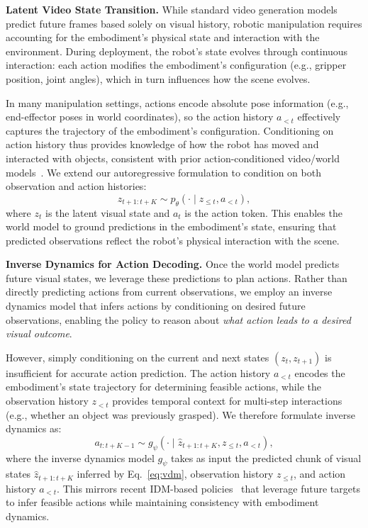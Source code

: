 \documentclass[onecolumn]{robbyant}           %
\begin{document}
\noindent\textbf{Latent Video State Transition.}
While standard video generation models predict future frames based solely on visual history, robotic manipulation requires accounting for the embodiment's physical state and interaction with the environment.
During deployment, the robot's state evolves through continuous interaction: each action modifies the embodiment's configuration (e.g., gripper position, joint angles), which in turn influences how the scene evolves.

In many manipulation settings, actions encode absolute pose information (e.g., end-effector poses in world coordinates), so the action history $a_{<t}$ effectively captures the trajectory of the embodiment's configuration.
Conditioning on action history thus provides knowledge of how the robot has moved and interacted with objects, consistent with prior action-conditioned video/world models~\cite{unisim,vidar,uwm}.
We extend our autoregressive formulation to condition on both observation and action histories:
\begin{equation}
z_{t+1:t+K} \sim p_\theta( \cdot \mid z_{\leq t}, a_{<t}),
\label{eq:vdm}
\end{equation}
where $z_t$ is the latent visual state and $a_t$ is the action token.
This enables the world model to ground predictions in the embodiment's state, ensuring that predicted observations reflect the robot's physical interaction with the scene.

\noindent\textbf{Inverse Dynamics for Action Decoding.}
Once the world model predicts future visual states, we leverage these predictions to plan actions.
Rather than directly predicting actions from current observations, we employ an inverse dynamics model that infers actions by conditioning on desired future observations, enabling the policy to reason about \textit{what action leads to a desired visual outcome}.

However, simply conditioning on the current and next states $(z_t, z_{t+1})$ is insufficient for accurate action prediction.
The action history $a_{<t}$ encodes the embodiment's state trajectory for determining feasible actions, while the observation history $z_{<t}$ provides temporal context for multi-step interactions (e.g., whether an object was previously grasped).
We therefore formulate inverse dynamics as:
\begin{equation}
a_{t:t+K-1} \sim g_\psi(\cdot \mid \hat{z}_{t+1:t+K}, z_{\leq t}, a_{<t}),
\label{eq:idm}
\end{equation}
where the inverse dynamics model $g_\psi$ takes as input the predicted chunk of visual states $\hat{z}_{t+1:t+K}$ inferred by Eq.~\ref{eq:vdm}, observation history $z_{\leq t}$, and action history $a_{<t}$.
This mirrors recent IDM-based policies~\cite{unipi,onexwm,mimicvideo,vidar,tian2025} that leverage future targets to infer feasible actions while maintaining consistency with embodiment dynamics.
\end{document}

